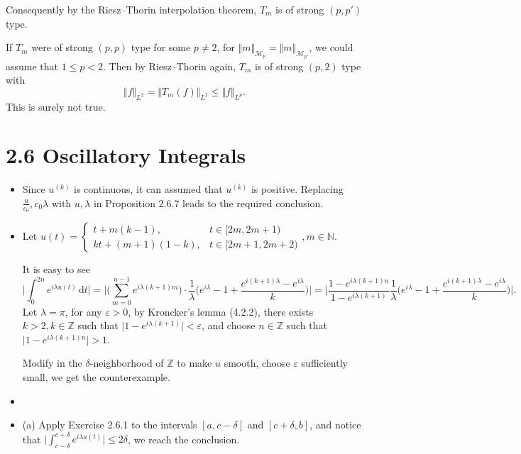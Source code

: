 \begin{itemize}
Consequently by the Riesz--Thorin interpolation theorem, 
$T_m$ is of strong $(p,p')$ type.

If $T_m$ were of strong $(p,p)$ type for some $p\not=2$, 
for $\Vert m\Vert_{\mathscr{M}_p}=\Vert m\Vert _{\mathscr{M}_{p'}}$, 
we could assume that $1\leq p<2$. 
Then by Riesz--Thorin again, $T_{m}$ is of strong $(p,2)$ type with
$$\Vert f\Vert _{L^2}=\Vert T_m(f)\Vert_{L^2}\leq \Vert f\Vert _{L^p}.$$
This is surely not true.

\end{itemize}

\section*{2.6 Oscillatory Integrals}
\begin{itemize}
\item[2.6.1]
Since $u^{(k)}$ is continuous, it can assumed that $u^{(k)}$ is positive. 
Replacing $\frac{u}{c_0},c_0\lambda$ with $u,\lambda$ in Proposition 2.6.7 
leads to the required conclusion.

\item[2.6.2]
Let $u(t)=
\begin{cases}
    t+m(k-1),&t\in[2m,2m+1)\\
    kt+(m+1)(1-k),&t\in[2m+1,2m+2)
\end{cases},m\in \mathbb{N}$.

It is easy to see
$$\bigg|\int_0^{2n}e^{i\lambda u(t)}\,\mathrm{d}t\bigg|=
\bigg|\bigg(\sum\limits_{m=0}^{n-1}e^{i\lambda(k+1)m}\bigg)\cdot
\frac1{\lambda}\bigg(e^{i\lambda}-1+\frac{e^{i(k+1)\lambda}-e^{i\lambda}}{k}\bigg)\bigg|
=\bigg|\frac{1-e^{i\lambda(k+1)n}}{1-e^{i\lambda (k+1)}}\frac1{\lambda}\bigg(e^{i\lambda}-1+\frac{e^{i(k+1)\lambda}-e^{i\lambda}}{k}\bigg)\bigg|.
$$
Let $\lambda=\pi$, for any $\varepsilon >0$, by Kroncker's lemma (4.2.2), 
there exists $k>2,k\in \mathbb{Z}$ such that 
$\big\vert 1-e^{i\lambda (k+1)}\big\vert <\varepsilon $, 
and choose $n\in \mathbb{Z}$ such that 
$\big\vert 1-e^{i\lambda (k+1)n}\big\vert>1$.

Modify in the $\delta$-neighborhood of $\mathbb{Z}$ to make $u$ smooth, 
choose $\varepsilon$ sufficiently small, we get the counterexample.

\item[2.6.3]

\item[2.6.4]
(a) Apply Exercise 2.6.1 to the intervals $[a,c-\delta]$ and $[c+\delta, b]$, 
and notice that $\big\vert \int _{c-\delta}^{c+\delta}e^{i\lambda u(t)}\big\vert \leq 2\delta$, 
we reach the conclusion.


\end{itemize}
